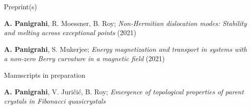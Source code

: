 

\begin{cventries}

  \cventry
    {Preprint(s)} %
    {} %
    {} %
    {} %
    {
      \begin{cvitems} %
      	\item{\textbf{A. Panigrahi}, R. Moessner, B. Roy; \textit{Non-Hermitian dislocation modes: Stability and melting across exceptional points} (2021) }
      	\item{\textbf{A. Panigrahi}, S. Mukerjee; \textit{Energy magnetization and transport in systems with a non-zero Berry curvature in a magnetic field} (2021)
      	}
      \end{cvitems}
    }

	\cventry
	{Manuscripts in preparation} %
	{} %
	{} %
	{} %
	{
	\begin{cvitems} %
		\item{\textbf{A. Panigrahi}, V. Juri\v{c}i\'c, B. Roy; \textit{Emergence of topological properties of parent crystals in Fibonacci quasicrystals}}
	\end{cvitems}
	}
\end{cventries}

